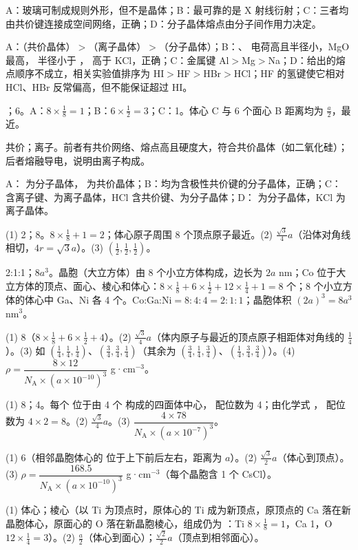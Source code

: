 \begin{jiexilist}
\item {}A：玻璃可制成规则外形，但不是晶体；B：最可靠的是 X 射线衍射；C：三者均由共价键连接成空间网络，正确；D：分子晶体熔点由分子间作用力决定。
\item {}A：（共价晶体）$>$（离子晶体）$>$（分子晶体）；B：、 电荷高且半径小，MgO 最高， 半径小于 ， 高于 KCl，正确；C：金属键 Al$>$Mg$>$Na；D：给出的熔点顺序不成立，相关实验值排序为 HI$>$HF$>$HBr$>$HCl；HF 的氢键使它相对 HCl、HBr 反常偏高，但不能保证超过 HI。
\item {}；6。A：$8\times\frac18=1$；B：$6\times\frac12=3$；C：1。体心 C 与 6 个面心 B 距离均为 $\frac a2$，最近。
\item 共价；离子。前者有共价网络、熔点高且硬度大，符合共价晶体（如二氧化硅）；后者熔融导电，说明由离子构成。
\item {}A： 为分子晶体， 为共价晶体；B：均为含极性共价键的分子晶体，正确；C： 含离子键、为离子晶体，HCl 含共价键、为分子晶体；D： 为分子晶体，KCl 为离子晶体。
\item (1) 2；8。$8\times\frac18+1=2$；体心原子周围 8 个顶点原子最近。(2) $\frac{\sqrt3}{4}a$（沿体对角线相切，$4r=\sqrt3a$）。(3) $(\frac12,\frac12,\frac12)$。
\item 2:1:1；$8a^3$。晶胞（大立方体）由 8 个小立方体构成，边长为 $2a$ nm；Co 位于大立方体的顶点、面心、棱心和体心：$8\times\frac18+6\times\frac12+12\times\frac14+1=8$ 个；8 个小立方体的体心中 Ga、Ni 各 4 个。Co:Ga:Ni$=8:4:4=2:1:1$；晶胞体积 $(2a)^3=8a^3$ nm$^3$。
\item (1) 8（$8\times\frac18+6\times\frac12+4$）。(2) $\frac{\sqrt3}{4}a$（体内原子与最近的顶点原子相距体对角线的 $\frac14$）。(3) 如 $(\frac14,\frac14,\frac14)$、$(\frac34,\frac34,\frac14)$（其余为 $(\frac34,\frac14,\frac34)$、$(\frac14,\frac34,\frac34)$）。(4) $\rho=\dfrac{8\times12}{N_\text{A}\times(a\times10^{-10})^3}$ g·cm$^{-3}$。
\item (1) 8；4。每个  位于由 4 个  构成的四面体中心， 配位数为 4；由化学式 ， 配位数为 $4\times2=8$。(2) $\frac{\sqrt3}{4}a$。(3) $\dfrac{4\times78}{N_\text{A}\times(a\times10^{-7})^3}$。
\item (1) 6（相邻晶胞体心的  位于上下前后左右，距离为 $a$）。(2) $\frac{\sqrt3}{2}a$（体心到顶点）。(3) $\rho=\dfrac{168.5}{N_\text{A}\times(a\times10^{-10})^3}$ g·cm$^{-3}$（每个晶胞含 1 个 CsCl）。
\item (1) 体心；棱心（以 Ti 为顶点时，原体心的 Ti 成为新顶点，原顶点的 Ca 落在新晶胞体心，原面心的 O 落在新晶胞棱心，组成仍为 ：Ti $8\times\frac18=1$，Ca 1，O $12\times\frac14=3$）。(2) $\frac a2$（体心到面心）；$\frac{\sqrt2}{2}a$（顶点到相邻面心）。

\end{jiexilist}
